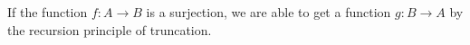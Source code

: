 \begin{code}%
%
\>[2]\<%
\\
\>[2][@{}l@{\AgdaIndent{0}}]%
\>[4]\AgdaSymbol{:}\AgdaSpace{}%
\AgdaSymbol{\{}\AgdaSpace{}%
\AgdaSymbol{:}\AgdaSpace{}%
\AgdaSpace{}%
\AgdaSymbol{\}\{}\AgdaSpace{}%
\AgdaSymbol{:}\AgdaSpace{}%
\AgdaSpace{}%
\AgdaSymbol{\}}\<%
\\
%
\>[4]\AgdaSpace{}%
\AgdaSymbol{(}\AgdaSpace{}%
\AgdaSymbol{:}\AgdaSpace{}%
\AgdaSpace{}%
\AgdaSpace{}%
\AgdaSymbol{)}\<%
\\
%
\>[4]\AgdaSpace{}%
\AgdaSpace{}%
\AgdaSymbol{(}\AgdaSpace{}%
\AgdaSpace{}%
\AgdaSymbol{)}\<%
\\
%
\\[\AgdaEmptyExtraSkip]%
%
\>[2]\AgdaSpace{}%
\AgdaSpace{}%
\AgdaSymbol{=}\AgdaSpace{}%
\AgdaSpace{}%
\AgdaSymbol{\{}\AgdaSpace{}%
\AgdaSymbol{\}}\AgdaSpace{}%
\AgdaSpace{}%
\AgdaSpace{}%
\AgdaSpace{}%
\AgdaSpace{}%
\AgdaSpace{}%
\AgdaSpace{}%
\AgdaSpace{}%
\AgdaSpace{}%
\AgdaSpace{}%
\<%
\end{code}


If the function $f : A → B$ is a surjection, we are able to get
a function $g : B → A$ by the recursion principle of truncation.

